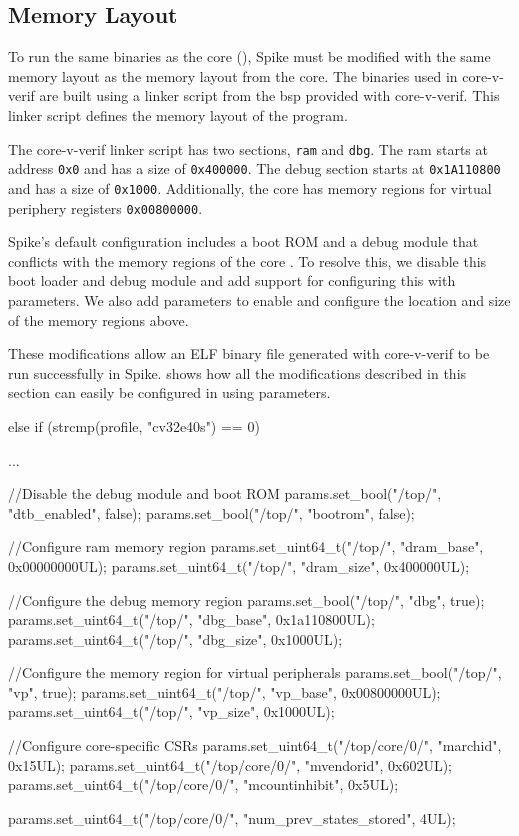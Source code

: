 \subsection{Memory Layout}%

To run the same binaries as the core (), Spike must be modified with the same memory layout as the memory layout from the core.
The binaries used in core-v-verif are built using a linker script from the \acrfull{bsp} provided with core-v-verif. This linker script defines the memory layout of the program.


The core-v-verif linker script \cite{openhwgroupCorevverifCv32e40sBsp} has two sections, \lstinline{ram} and \lstinline{dbg}. The ram starts at address \lstinline{0x0} and has a size of \lstinline{0x400000}. The debug section starts at \lstinline{0x1A110800} and has a size of \lstinline{0x1000}. Additionally, the core has memory regions for virtual periphery registers  \lstinline{0x00800000}.


Spike's default configuration includes a boot ROM and a debug module that conflicts with the memory regions of the core \cite{evancoxAddDocumentationLowlevel2017}. To resolve this, we disable this boot loader and debug module and add support for configuring this with parameters. We also add parameters to enable and configure the location and size of the memory regions above.

These modifications allow an ELF binary file generated with core-v-verif to be run successfully in Spike. 
 shows how all the modifications described in this section can easily be configured in  using parameters.

\begin{clisting}[caption=Code in \ccode{spike_set_default_params(profile)} configuring Spike for the CV32E40S core.,label=lst:config]
else if (strcmp(profile, "cv32e40s") == 0)
  {
    ...

    //Disable the debug module and boot ROM
    params.set_bool("/top/", "dtb_enabled", false);
    params.set_bool("/top/", "bootrom", false);

    //Configure ram memory region
    params.set_uint64_t("/top/", "dram_base", 0x00000000UL);
    params.set_uint64_t("/top/", "dram_size", 0x400000UL);

    //Configure the debug memory region
    params.set_bool("/top/", "dbg", true);
    params.set_uint64_t("/top/", "dbg_base", 0x1a110800UL);
    params.set_uint64_t("/top/", "dbg_size", 0x1000UL);

    //Configure the memory region for virtual peripherals
    params.set_bool("/top/", "vp", true);
    params.set_uint64_t("/top/", "vp_base", 0x00800000UL);
    params.set_uint64_t("/top/", "vp_size", 0x1000UL);

    //Configure core-specific CSRs
    params.set_uint64_t("/top/core/0/", "marchid", 0x15UL);
    params.set_uint64_t("/top/core/0/", "mvendorid", 0x602UL);
    params.set_uint64_t("/top/core/0/", "mcountinhibit", 0x5UL);

    params.set_uint64_t("/top/core/0/", "num_prev_states_stored", 4UL);
  } 
\end{clisting}


